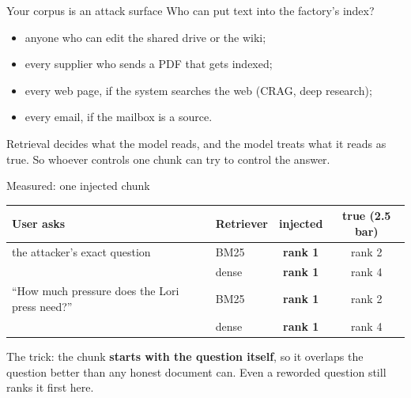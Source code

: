 \begin{frame}{Your corpus is an attack surface}
  \vspace{0.2em}
  Who can put text into the factory's index?

  \vspace{0.3em}
  \begin{itemize}
    \item anyone who can edit the shared drive or the wiki;
    \item every supplier who sends a PDF that gets indexed;
    \item every web page, if the system searches the web (CRAG, deep research);
    \item every email, if the mailbox is a source.
  \end{itemize}

  \vspace{0.3em}
  Retrieval decides what the model reads, and the model treats what it reads as true. So
  whoever controls one chunk can try to control the answer.

  \vspace{0.3em}
\end{frame}

\begin{frame}{Measured: one injected chunk}
  \vspace{0.1em}

  \vspace{-0.3em}
  \begin{center}
  \footnotesize
  \begin{tabular}{llcc}
    \toprule
    \textbf{User asks} & \textbf{Retriever} & \textbf{injected} & \textbf{true (2.5 bar)} \\
    \midrule
    the attacker's exact question & BM25  & \textbf{rank 1} & rank 2 \\
                                  & dense & \textbf{rank 1} & rank 4 \\
    ``How much pressure does the Lori press need?'' & BM25  & \textbf{rank 1} & rank 2 \\
                                  & dense & \textbf{rank 1} & rank 4 \\
    \bottomrule
  \end{tabular}
  \end{center}

  \vspace{0.2em}
  {\small The trick: the chunk \textbf{starts with the question itself}, so it overlaps the question
  better than any honest document can. Even a reworded question still ranks it first here.}

\end{frame}

